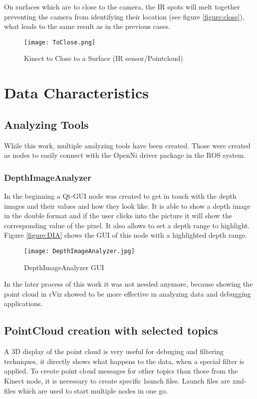 On surfaces which are to close to the camera, the IR spots will melt together preventing the camera from
identifying their location (see figure \vref{figure:close}), what leads to the same result as in the previous cases.
\begin{figure}[htp]
\begin{center}
  \texttt{[image: ToClose.png]} 
  \caption{Kinect to Close to a Surface (IR sensor/Pointcloud)}
  \label{figure:close}
\end{center}
\end{figure}
\clearpage 
 
\section{Data Characteristics} 
 
\subsection{Analyzing Tools}

While this work, multiple analyzing tools have been created. Those were created as
nodes to easily connect with the OpenNi driver package in the ROS system.

\subsubsection{DepthImageAnalyzer}
In the beginning a Qt-GUI node was created to get in touch with the depth images and 
their values and how they look like. It is able to show a depth image in the double
format and if the user clicks into the picture it will show the corresponding 
value of the pixel. It also allows to set a depth range to highlight. 
Figure \vref{figure:DIA} shows the GUI of this node with a highlighted depth range.

\begin{figure}[h!tp]
\begin{center}
  \texttt{[image: DepthImageAnalyzer.jpg]}
  \caption{DepthImageAnalyzer GUI}
  \label{figure:DIA}
\end{center}
\end{figure}
\clearpage 


In the later process of this work it was not needed anymore, because showing the point cloud
in rViz showed to be more effective in analyzing data and debugging applications.

\subsection{PointCloud creation with selected topics}
A 3D display of the point cloud is very useful for debuging and filtering techniques, it directly shows what 
happens to the data, when a special filter is applied.
To create point cloud messages for other topics than those from the Kinect node, it is necessary to
create specific launch files. Launch files are xml-files which are used to start multiple nodes in one
go. 


